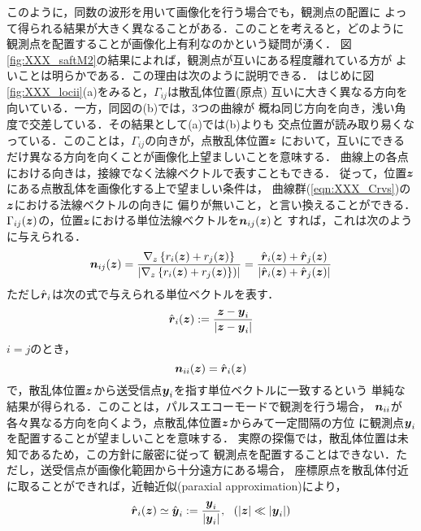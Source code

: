 このように，同数の波形を用いて画像化を行う場合でも，観測点の配置に
よって得られる結果が大きく異なることがある．このことを考えると，どのように
観測点を配置することが画像化上有利なのかという疑問が湧く．
図\ref{fig:XXX_saftM2}の結果によれば，観測点が互いにある程度離れている方が
よいことは明らかである．この理由は次のように説明できる．
はじめに図\ref{fig:XXX_locii}(a)をみると，$\Gamma_{ij}$は散乱体位置(原点)
互いに大きく異なる方向を向いている．一方，同図の(b)では，3つの曲線が
概ね同じ方向を向き，浅い角度で交差している．その結果として(a)では(b)よりも
交点位置が読み取り易くなっている．このことは，$\Gamma_{ij}$の向きが，点散乱体位置$\mbox{\boldmath $z$}$
において，互いにできるだけ異なる方向を向くことが画像化上望ましいことを意味する．
曲線上の各点における向きは，接線でなく法線ベクトルで表すこともできる．
従って，位置$\mbox{\boldmath $z$}$にある点散乱体を画像化する上で望ましい条件は，
曲線群(\ref{eqn:XXX_Crvs})の$\mbox{\boldmath $z$}$における法線ベクトルの向きに
偏りが無いこと，と言い換えることができる．
$\Gamma_{ij}(\mbox{\boldmath $z$})$の，位置$\mbox{\boldmath $z$}$における単位法線ベクトルを$\mbox{\boldmath $n$}_{ij}(\mbox{\boldmath $z$})$と
すれば，これは次のように与えられる．
\begin{equation}
	\mbox{\boldmath $n$}_{ij}(\mbox{\boldmath $z$}) 
	=\frac{\nabla_z \left\{ r_i(\mbox{\boldmath $z$})+r_j(\mbox{\boldmath $z$})\right\}}
	{\left| \nabla_z \left\{r_i(\mbox{\boldmath $z$})+r_j(\mbox{\boldmath $z$})\right\})\right|}
	=\frac{
		\hat{\mbox{\boldmath $r$}}_i(\mbox{\boldmath $z$})+\hat{\mbox{\boldmath $r$}}_j(\mbox{\boldmath $z$})
	}{
		\left| \hat{\mbox{\boldmath $r$}}_i(\mbox{\boldmath $z$})+\hat{\mbox{\boldmath $r$}}_j(\mbox{\boldmath $z$}) \right|
	}
	\label{eqn:XXX_08}
\end{equation}
ただし$\hat{\mbox{\boldmath $r$}}_i$は次の式で与えられる単位ベクトルを表す．
\begin{equation}
	\hat{\mbox{\boldmath $r$}}_i(\mbox{\boldmath $z$}):=
	\frac{\mbox{\boldmath $z$}-\mbox{\boldmath $y$}_i}
	{\left| \mbox{\boldmath $z$} -\mbox{\boldmath $y$}_i\right|}
	\label{eqn:XXX_ri_hat}
\end{equation}
$i=j$のとき，
\begin{equation}
	\mbox{\boldmath $n$}_{ii}(\mbox{\boldmath $z$})=\hat{\mbox{\boldmath $r$}}_i(\mbox{\boldmath $z$})
	\label{eqn:normal_pecho}
\end{equation}
で，散乱体位置$\mbox{\boldmath $z$}$から送受信点$\mbox{\boldmath $y$}_i$を指す単位ベクトルに一致するという
単純な結果が得られる．このことは，パルスエコーモードで観測を行う場合，
$\mbox{\boldmath $n$}_{ii}$が各々異なる方向を向くよう，点散乱体位置$\mbox{\boldmath $z$}$からみて一定間隔の方位
に観測点$\mbox{\boldmath $y$}_i$を配置することが望ましいことを意味する．
実際の探傷では，散乱体位置は未知であるため，この方針に厳密に従って
観測点を配置することはできない．ただし，送受信点が画像化範囲から十分遠方にある場合，
座標原点を散乱体付近に取ることができれば，近軸近似(paraxial approximation)により，
\begin{equation}
	\hat{\mbox{\boldmath $r$}}_i(\mbox{\boldmath $z$}) \simeq \hat{\mbox{\boldmath $y$}}_i:= \frac{\mbox{\boldmath $y$}_i}{|\mbox{\boldmath $y$}_i|}
	, \ \ (|\mbox{\boldmath $z$}|\ll |\mbox{\boldmath $y$}_i|)
	\label{eqn:XXX_09}
\end{equation}
